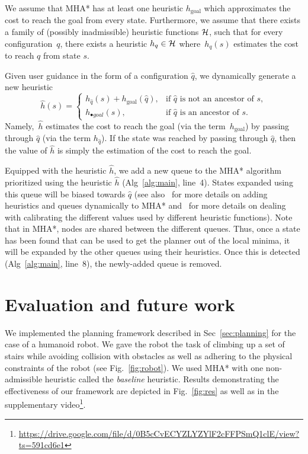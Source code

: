 \documentclass[conference]{IEEEtran}
\begin{document}
We assume that MHA* has at least one heuristic $h_{\text{goal}}$ which approximates the cost to reach the goal from every state.
Furthermore, we assume that there exists a family of (possibly inadmissible) heuristic functions $\mathcal{H}$, such that for every configuration~$q$, there exists a heuristic $h_q \in \mathcal{H}$ where~$h_q(s)$ estimates the cost to reach $q$ from state $s$.

Given user guidance in the form of a configuration $\hat{q}$, we dynamically generate a new heuristic $$
    \hat{h}(s)= 
\begin{cases}
    h_{\hat{q}}(s) + h_{\text{goal}}(\hat{q}),	& 
    		\text{if } \hat{q} \text{ is not an ancestor of } s,\\
    h_{\textbf{•}{goal}}(s),            		& 
    		\text{if } \hat{q} \text{ is an ancestor of } s.
\end{cases}
$$
Namely,~$\hat{h}$ estimates the 
cost to reach the goal (via the term~$h_{\text{goal}}$) by passing through $\hat{q}$ (via the term $h_{\hat{q}}$). If the state was reached by passing through $\hat{q}$, then the value of $\hat{h}$ is simply the estimation of the cost to reach the goal.


Equipped with the heuristic $\hat{h}$, we add a new queue to the MHA* algorithm prioritized using the heuristic $\hat{h}$ (Alg~\ref{alg:main}, line~4). 
States expanded using this queue will be biased towards $\hat{q}$ (see also~\cite{INL15} for more details on adding heuristics and queues dynamically to MHA*
and~\cite{NAL15} for more details on dealing with calibrating the different values used by different heuristic functions).
Note that in MHA*, nodes are shared between the different queues.
Thus, once a state has been found that can be used to get the planner out of the local minima, it will be expanded by the other queues using their heuristics.
Once this is detected (Alg~\ref{alg:main}, line~8), the newly-added queue is removed.


\section{Evaluation and future work}\label{sec:eval}
We implemented the planning framework described in Sec~\ref{sec:planning} for the case of a humanoid robot. We gave the robot the task of climbing up a set of stairs while avoiding collision with obstacles as well as adhering to the physical constraints of the robot (see Fig.~\ref{fig:robot}).
We used MHA* with one non-admissible heuristic called the \emph{baseline} heuristic.
Results demonstrating the effectiveness of our framework are depicted in Fig.~\ref{fig:res}
as well as in the supplementary video\footnote{
\url{https://drive.google.com/file/d/0B5cCvECYZLYZYlF2cFFPSmQ1clE/view?ts=591cd6e1}}. 
\end{document}
